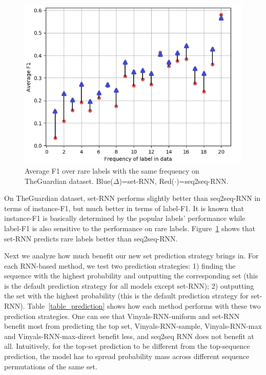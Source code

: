 \begin{figure}[t]
\includegraphics[width=1.0\columnwidth]{figs/labelf1_v2.png}

\caption{Average F1 over rare labels with the same frequency on TheGuardian dataset. Blue($\Delta$)=set-RNN, Red($\cdot$)=seq2seq-RNN.}
\label{fig:labelf1}
\end{figure}

On TheGuardian dataset, set-RNN performs slightly better than seq2seq-RNN in terms of instance-F1, but much better in terms of label-F1. It is known that instance-F1 is basically determined by the popular labels' performance while label-F1 is also sensitive to the performance on rare labels. Figure~\ref{fig:labelf1} shows that set-RNN predicts rare labels better than seq2seq-RNN.

Next we analyze how much benefit our new set prediction strategy brings in. For each RNN-based method, we test two prediction strategies: 1) finding the sequence with the highest probability and outputting the corresponding set (this is the default prediction strategy for all models except set-RNN); 2) outputting the set with the highest probability (this is the default prediction strategy for set-RNN). Table~\ref{table_prediction} shows how each method performs with these two prediction strategies. One can see that Vinyals-RNN-uniform and set-RNN benefit most from predicting the top set, Vinyals-RNN-sample, Vinyals-RNN-max and Vinyals-RNN-max-direct benefit less, and seq2seq RNN does not benefit at all. Intuitively, for the top-set prediction to be different from the top-sequence prediction, the model has to spread probability mass across different sequence permutations of the same set. 

